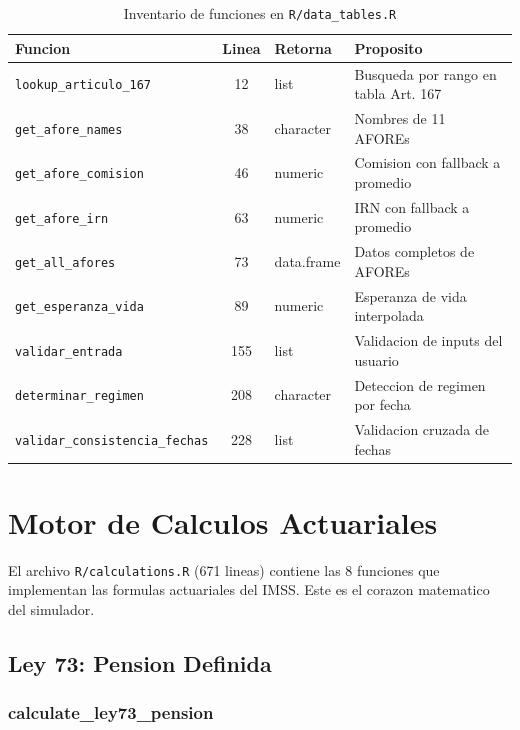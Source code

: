 \documentclass[11pt, letterpaper, twoside]{report}
\begin{document}
\begin{table}[h]
\centering
\caption{Inventario de funciones en \texttt{R/data\_tables.R}}
\label{tab:data_functions}
\begin{tabularx}{\textwidth}{lclX}
\toprule
\textbf{Funcion} & \textbf{Linea} & \textbf{Retorna} & \textbf{Proposito} \\
\midrule
\texttt{lookup\_articulo\_167} & 12 & list & Busqueda por rango en tabla Art. 167 \\
\texttt{get\_afore\_names} & 38 & character & Nombres de 11 AFOREs \\
\texttt{get\_afore\_comision} & 46 & numeric & Comision con fallback a promedio \\
\texttt{get\_afore\_irn} & 63 & numeric & IRN con fallback a promedio \\
\texttt{get\_all\_afores} & 73 & data.frame & Datos completos de AFOREs \\
\texttt{get\_esperanza\_vida} & 89 & numeric & Esperanza de vida interpolada \\
\texttt{validar\_entrada} & 155 & list & Validacion de inputs del usuario \\
\texttt{determinar\_regimen} & 208 & character & Deteccion de regimen por fecha \\
\texttt{validar\_consistencia\_fechas} & 228 & list & Validacion cruzada de fechas \\
\bottomrule
\end{tabularx}
\end{table}


\chapter{Motor de Calculos Actuariales}
\label{ch:calculos}

El archivo \texttt{R/calculations.R} (671 lineas) contiene las 8 funciones que
implementan las formulas actuariales del IMSS. Este es el corazon matematico
del simulador.

\section{Ley 73: Pension Definida}
\label{sec:ley73}

\subsection{calculate\_ley73\_pension}
\end{document}
